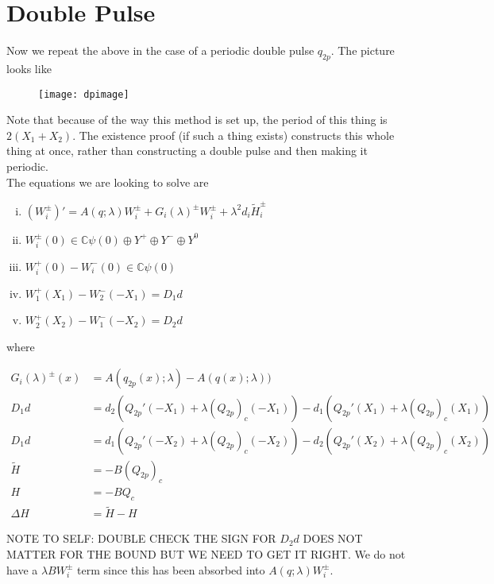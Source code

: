 \documentclass[12pt]{article}
\def\C{{\mathbb C}}
\begin{document}
\section*{Double Pulse}

Now we repeat the above in the case of a periodic double pulse $q_{2p}$. The picture looks like

\begin{figure}[H]
\texttt{[image: dpimage]}
\end{figure}

Note that because of the way this method is set up, the period of this thing is $2(X_1 + X_2)$. The existence proof (if such a thing exists) constructs this whole thing at once, rather than constructing a double pulse and then making it periodic. \\

The equations we are looking to solve are

\begin{enumerate}[(i)]
\item $(W_i^\pm)' = A(q; \lambda) W_i^\pm + G_i(\lambda)^\pm W_i^\pm + \lambda^2 d_i \tilde{H}_i^\pm$
\item $W_i^\pm(0) \in \C \psi(0) \oplus Y^+ \oplus Y^- \oplus Y^0$
\item $W_i^+(0) - W_i^-(0) \in \C \psi(0) $
\item $W_1^+(X_1) - W_2^-(-X_1) = D_1 d$
\item $W_2^+(X_2) - W_1^-(-X_2) = D_2 d$
\end{enumerate}

where

\begin{align*}
G_i(\lambda)^\pm (x) &= A(q_{2p}(x);\lambda) - A(q(x);\lambda)) \\
D_1 d &= d_2(Q_{2p}'(-X_1) + \lambda (Q_{2p})_c(-X_1))
- d_1 ( Q_{2p}'(X_1) + \lambda (Q_{2p})_c(X_1) ) \\
D_1 d &= d_1(Q_{2p}'(-X_2) + \lambda (Q_{2p})_c(-X_2))
- d_2 ( Q_{2p}'(X_2) + \lambda (Q_{2p})_c(X_2) ) \\
\tilde{H} &= -B(Q_{2p})_c \\
H &= -B Q_c \\
\Delta H &= \tilde{H} - H
\end{align*}

NOTE TO SELF: DOUBLE CHECK THE SIGN FOR $D_2 d$ DOES NOT MATTER FOR THE BOUND BUT WE NEED TO GET IT RIGHT. We do not have a $\lambda B W_i^\pm$ term since this has been absorbed into $A(q; \lambda) W_i^\pm$. \\
\end{document}

